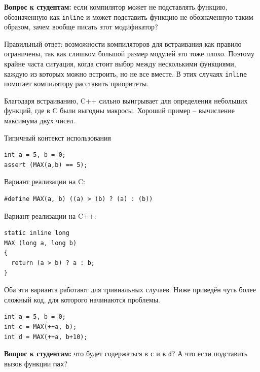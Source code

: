 \documentclass[a4paper,12pt,oneside]{book}
\newif\ifanswers
\begin{document}
\textbf{Вопрос к студентам:} если компилятор может не подставлять функцию, обозначенную как \lstinline!inline! и может подставить функцию не обозначенную таким образом, зачем вообще писать этот модификатор?

\ifanswers
Возможный ответ: \lstinline!inline! позволяет определение функции в каждом модуле (но увы это можно парировать тем, что для этого есть \lstinline!static!)
\fi

Правильный ответ: возможности компиляторов для встраивания как правило ограничены, так как слишком большой размер модулей это тоже плохо. Поэтому крайне часта ситуация, когда стоит выбор между несколькими функциями, каждую из которых можно встроить, но не все вместе. В этих случаях \lstinline!inline! помогает компилятору расставить приоритеты.

Благодаря встраиванию, C++ сильно выигрывает для определения небольших функций, где в C были выгодны макросы. Хороший пример -- вычисление максимума двух чисел.

Типичный контекст использования

\begin{lstlisting}
int a = 5, b = 0;
assert (MAX(a,b) == 5);
\end{lstlisting}

Вариант реализации на C:

\begin{lstlisting}
#define MAX(a, b) ((a) > (b) ? (a) : (b))
\end{lstlisting}

Вариант реализации на C++:

\begin{lstlisting}
static inline long
MAX (long a, long b)
{
  return (a > b) ? a : b;
} 
\end{lstlisting}

Оба эти варианта работают для тривиальных случаев. Ниже приведён чуть более сложный код, для которого начинаются проблемы.

\begin{lstlisting}
int a = 5, b = 0;
int c = MAX(++a, b);
int d = MAX(++a, b+10);
\end{lstlisting}

\textbf{Вопрос к студентам:} что будет содержаться в \lstinline!c! и в \lstinline!d!? А что если подставить вызов функции \lstinline!max!? 

\ifanswers
Правильный ответ: макрос раскроется как \lstinline!((++a) > (b) ? (++a) : (b))! то есть в сишной версии \lstinline!a! будет инкрементирована дважды. В C++ версии всё норм.
\fi
\end{document}
